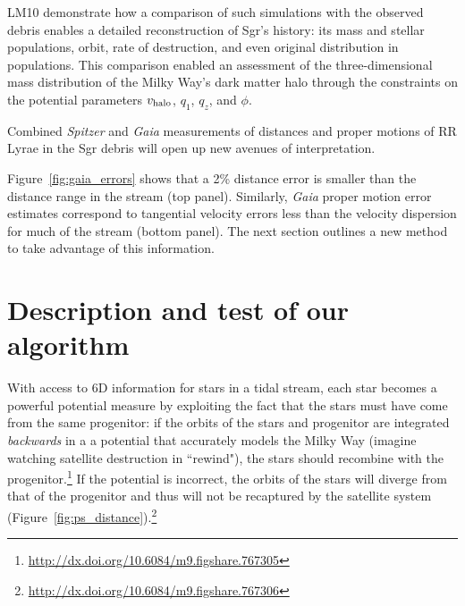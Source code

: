 \documentclass{emulateapj}
\begin{document}
LM10 demonstrate how a comparison of such simulations with the
observed debris enables a detailed reconstruction of Sgr's history:
its mass and stellar populations, orbit, rate of destruction, and even
original distribution in populations. 
This comparison enabled an assessment of the three-dimensional 
mass distribution of the Milky Way's dark matter
halo through the constraints on the potential parameters $v_{\rm halo}$, $q_1$, $q_z$, and $\phi$.

Combined {\it Spitzer} and {\it Gaia} measurements of distances and proper motions
of RR Lyrae in the Sgr debris will open up new avenues of
interpretation. 

Figure~\ref{fig:gaia_errors} shows that a 2\% distance error is smaller than the 
distance range in the stream (top panel). Similarly, {\it Gaia} proper motion
error estimates correspond to tangential velocity errors less than the velocity
dispersion for much of the stream (bottom panel). The next section outlines a 
new method to take advantage of this information. 


\section{Description and test of our algorithm}
\label{sec:method}
With access to 6D information for stars in a tidal
stream, each star becomes a powerful potential
measure by exploiting the fact that the stars must have come from the
same progenitor: if the orbits of the stars and progenitor are integrated 
\emph{backwards} in a a potential that accurately models the Milky Way
(imagine watching satellite destruction in ``rewind"), the stars
should recombine with the progenitor.\footnote{\url{http://dx.doi.org/10.6084/m9.figshare.767305}} If the potential is incorrect,
the orbits of the stars will diverge from that of the progenitor and
thus will not be recaptured by the satellite system (Figure~\ref{fig:ps_distance}).\footnote{\url{http://dx.doi.org/10.6084/m9.figshare.767306}}
\end{document}
